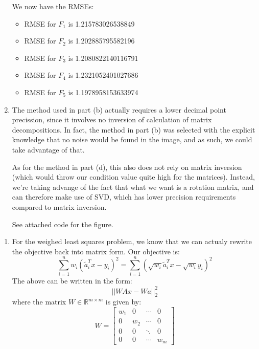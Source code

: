 \documentclass[12pt]{exam}
\begin{document}
\begin{questions}
\begin{solution}
\begin{enumerate}[label=(\alph*)]
      We now have the RMSEs:
        \begin{itemize}
          \item RMSE for $F_1$ is 1.215783026538849
          \item RMSE for $F_2$ is 1.202885795582196
          \item RMSE for $F_3$ is 1.2080822140116791
          \item RMSE for $F_4$ is 1.2321052401027686
          \item RMSE for $F_5$ is 1.1978958153633974
        \end{itemize}
      \item The method used in part (b) actually requires a lower decimal point precission, since it involves no inversion of calculation of matrix decompositions. In fact, the method in part (b) was selected with the explicit knowledge that no noise would be found in the image, and as such, we could take advantage of that.

      As for the method in part (d), this also does not rely on matrix inversion (which would throw our condition value quite high for the matrices). Instead, we're taking advange of the fact that what we want is a rotation matrix, and can therefore make use of SVD, which has lower precision requirements compared to matrix inversion.

      See attached code for the figure.
    \end{enumerate}
  \end{solution}

\begin{solution}
  \begin{enumerate}[label=(\alph*)]
    \item For the weighed least squares problem, we know that we can actualy rewrite the objective back into matrix form. Our objective is:
    \[
      \sum_{i=1}^n w_i(\tilde{a}_i^T x - y_i)^2 = \sum_{i=1}^n (\sqrt{w_i}\tilde{a}_i^T x - \sqrt{w_i}y_i)^2 
    \]
    The above can be written in the form:
    $$
      ||WAx - Wa ||_2^2
    $$
    where the matrix $W \in \mathbb{R}^{m \times m}$ is given by:
    \[
      W =
        \begin{bmatrix}
          w_1 & 0 & \cdots & 0 \\
          0 & w_2 & \cdots & 0 \\
          0 & 0 & \ddots & 0 \\
          0 & 0  & \cdots & w_m
        \end{bmatrix}
    \]


\end{enumerate}
\end{solution}
\end{questions}
\end{document}
